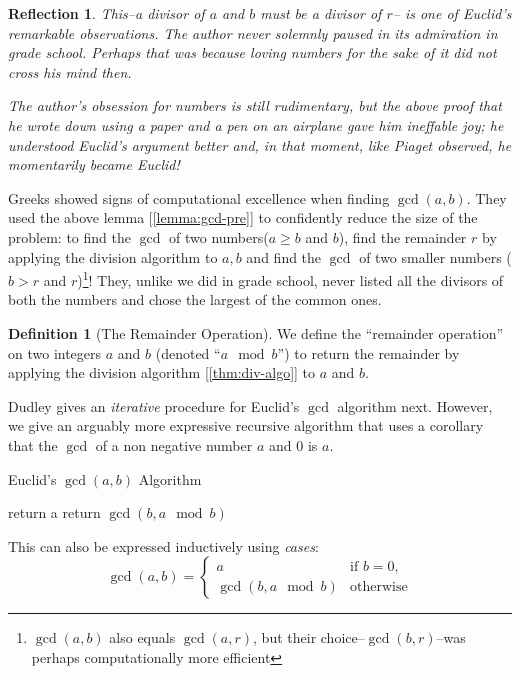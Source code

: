 \documentclass[english,notitlepage,smartquotes]{hgbreport}
\theoremstyle{definition}
\newtheorem{definition}{Definition}
\theoremstyle{remark}
\theoremstyle{plain}
\newtheorem{reflection}{Reflection}
\begin{document}
\begin{reflection}
This--a divisor of $a$ and $b$ must be a divisor of $r$-- is one of Euclid's remarkable observations. The author never solemnly paused in its admiration in grade school. Perhaps that was because loving numbers for the sake of it did not cross his mind then.

The author's obsession for numbers is still rudimentary, but the above proof that he wrote down using a paper and a pen on an airplane gave him ineffable joy; he understood Euclid's argument better and, in that moment, like Piaget \cite{Piaget1974} observed, he \emph{momentarily became Euclid}! 
\end{reflection}

Greeks showed signs of computational excellence when finding $\gcd(a,b)$. They used the above lemma [\ref{lemma:gcd-pre}] to confidently reduce the size of the problem: to find the $\gcd$ of two numbers($a\geq b$ and $b$), find the remainder $r$ by applying the division algorithm to $a,b$ and find the $\gcd$ of two smaller numbers ($b>r$ and $r$)\footnote{$\gcd(a,b)$ also equals $\gcd(a,r)$, but their choice--$\gcd(b,r)$--was perhaps computationally more efficient}! They, unlike we did in grade school, never listed all the divisors of both the numbers and chose the largest of the common ones.

\begin{definition}[The Remainder Operation]
\label{def:modop}
We define the ``remainder operation'' on two integers $a$ and $b$ (denoted ``$a\mod b$'') to return the remainder by applying the division algorithm [\ref{thm:div-algo}] to $a$ and $b$.
\end{definition}

Dudley gives an \emph{iterative} procedure for Euclid's $\gcd$ algorithm next. However, we give an arguably more expressive recursive algorithm that uses a corollary that the $\gcd$ of a non negative number $a$ and $0$ is $a$. 

\begin{algorithm}
\begin{algorithmic}
\caption{Euclid's $\gcd(a,b)$ Algorithm}
\label{alg:euclid}
    \State return a
  \Else
    \State return $\gcd(b,a\mod b)$
  \EndIf
\end{algorithmic}
\end{algorithm}

This can also be expressed inductively using \emph{cases}:
\[
\gcd(a,b)=
\begin{cases}
a& \text{if $b=0$}, \\
\gcd(b,a\mod b)& \text{otherwise}
\end{cases}
\]
\end{document}
